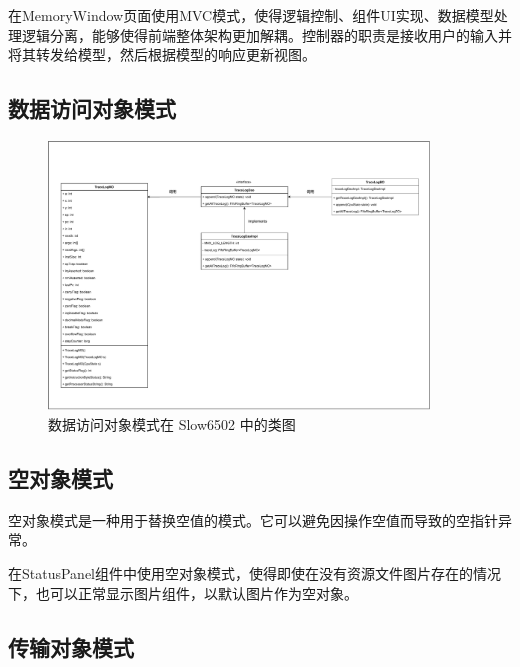 \documentclass[cn,black,12pt,normal]{elegantnote}
\begin{document}
在MemoryWindow页面使用MVC模式，使得逻辑控制、组件UI实现、数据模型处理逻辑分离，能够使得前端整体架构更加解耦。控制器的职责是接收用户的输入并将其转发给模型，然后根据模型的响应更新视图。


\subsection{数据访问对象模式}

\begin{figure}[H]
  \centering
  \includegraphics[width=0.9\textwidth]{figures/数据访问对象模式.pdf}
  \caption{数据访问对象模式在 Slow6502 中的类图}
\end{figure}


\subsection{空对象模式}

空对象模式是一种用于替换空值的模式。它可以避免因操作空值而导致的空指针异常。


在StatusPanel组件中使用空对象模式，使得即使在没有资源文件图片存在的情况下，也可以正常显示图片组件，以默认图片作为空对象。

\subsection{传输对象模式}
\end{document}
